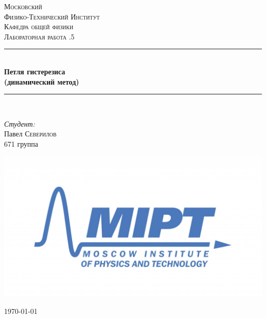\documentclass[a4paper, 12pt]{article}
\newenvironment{bottompar}{\par\vspace*{\fill}}{\clearpage}
\begin{document}
	\begin{titlepage}
		
		\newcommand{\HRule}{\rule{\linewidth}{0.5mm}} %
		
		\center %
		
		
		\textsc{\LARGE Московский \\[0.5cm] Физико-Технический Институт}\\[1,5cm] %
		\textsc{\Large Кафедра общей физики}\\[0.5cm] %
		\textsc{\large Лабораторная работа .5}\\[0.5cm] %
		
		
		\HRule
		\\[0.4cm]
		{ \huge \bfseries Петля гистерезиса \\(динамический метод)}
		\\[0.2cm] %
		\HRule
		\\[1.5cm]
		
		
		\begin{flushleft} \large
			\emph{Студент:}\\
			Павел \textsc{Северилов} \\
			671 группа
		\end{flushleft}
		
		\begin{bottompar}
			\begin{center}
				\includegraphics[width = 80 mm]{logo.jpg}
			\end{center}
			{\large \today}
			
		\end{bottompar}
		\vfill %
		
	\end{titlepage}
\end{document}
